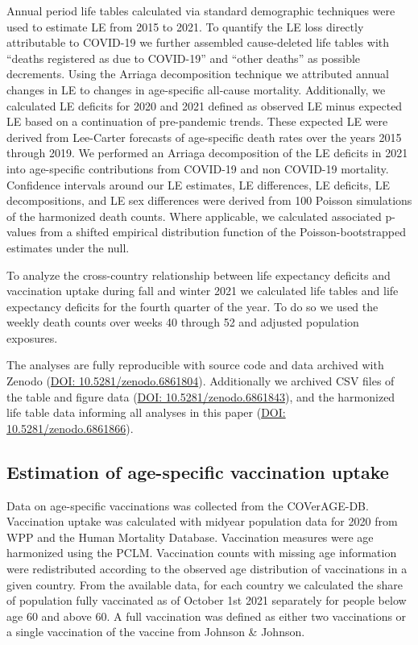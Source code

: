 \documentclass[12pt]{article}
\begin{document}
Annual period life tables calculated via standard demographic techniques\cite{Chiang1979} were used to estimate LE from 2015 to 2021. To quantify the LE loss directly attributable to COVID-19 we further assembled cause-deleted life tables with ``deaths registered as due to COVID-19'' and ``other deaths'' as possible decrements.\cite{Preston2001} Using the Arriaga decomposition technique\cite{Arriaga1984} we attributed annual changes in LE to changes in age-specific all-cause  mortality. Additionally, we calculated LE deficits for 2020 and 2021 defined as observed LE minus expected LE based on a continuation of pre-pandemic trends. These expected LE were derived from Lee-Carter forecasts\cite{Lee1992} of age-specific death rates over the years 2015 through 2019. We performed an Arriaga decomposition of the LE deficits in 2021 into age-specific contributions from COVID-19 and non COVID-19 mortality.
Confidence intervals around our LE estimates, LE differences, LE deficits, LE decompositions, and LE sex differences were derived from 100 Poisson simulations of the harmonized death counts. Where applicable, we calculated associated p-values from a shifted empirical distribution function of the Poisson-bootstrapped estimates under the null.

To analyze the cross-country relationship between life expectancy deficits and vaccination uptake during fall and winter 2021 we calculated life tables and life expectancy deficits for the fourth quarter of the year. To do so we used the weekly death counts over weeks 40 through 52 and adjusted population exposures.

The analyses are fully reproducible with source code and data archived with Zenodo (\href{https://zenodo.org/record/6861804}{DOI: 10.5281/zenodo.6861804}). Additionally we archived CSV files of the table and figure data (\href{https://zenodo.org/record/6861843}{DOI: 10.5281/zenodo.6861843}), and the harmonized life table data informing all analyses in this paper (\href{https://zenodo.org/record/6861866}{DOI: 10.5281/zenodo.6861866}).

\subsection*{Estimation of age-specific vaccination uptake}

Data on age-specific vaccinations was collected from the COVerAGE-DB.\cite{Riffe2021} Vaccination uptake was calculated with midyear population data for 2020 from WPP\cite{UnitedNations2021} and the Human Mortality Database. Vaccination measures were age harmonized using the PCLM. Vaccination counts with missing age information were redistributed according to the observed age distribution of vaccinations in a given country. From the available data, for each country we calculated the share of population fully vaccinated as of October 1st 2021 separately for people below age 60 and above 60. A full vaccination was defined as either two vaccinations or a single vaccination of the vaccine from Johnson \& Johnson.
\end{document}
